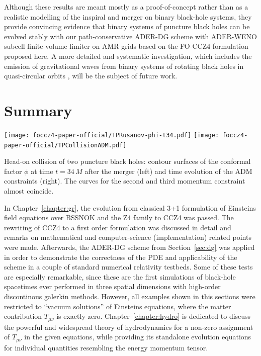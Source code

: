 Although these results are meant mostly as a proof-of-concept rather than
as a realistic modelling of the inspiral and merger on binary black-hole
systems, they provide convincing evidence that binary systems of puncture
black holes can be evolved stably with our path-conservative ADER-DG
scheme with ADER-WENO subcell finite-volume limiter on AMR grids based on
the FO-CCZ4 formulation proposed here. A more detailed and systematic
investigation, which includes the emission of gravitational waves from
binary systems of rotating black holes in quasi-circular orbits 
\cite{Alic:2011a}, will be the subject of future work.

\section{Summary}
\begin{marginfigure}
	\texttt{[image: foccz4-paper-official/TPRusanov-phi-t34.pdf]}
	\texttt{[image: foccz4-paper-official/TPCollisionADM.pdf]}
	\caption[
	BH Head-on collision, final snapshot and error time evolution, 
	]{Head-on collision of two puncture black holes: contour
		surfaces of the conformal factor $\phi$ at time $t=34\,M$ after the
		merger (left) and time evolution of the ADM constraints (right).
		The curves for the second and third momentum constraint almost
		coincide. }
	\label{fig.twopunctures.adm}
\end{marginfigure}

In Chapter~\ref{chapter:gr}, the evolution from classical 3+1 formulation of
Einsteins field equations over BSSNOK and the Z4 family to CCZ4 was passed. The
rewriting of CCZ4 to a first order formulation was discussed in detail and
remarks on mathematical and computer-science (implementation) related points
were made. Afterwards, the ADER-DG scheme from Section~\ref{sec:dg} was applied
in order to demonstrate the correctness of the PDE and applicability of the
scheme in a couple of standard numerical relativity testbeds. Some of these
tests are especially remarkable, since these are the first simulations of 
black-hole spacetimes ever performed in three spatial dimensions with high-order
discontinous galerkin methods. However, all examples shown in this sections
were restricted to ``vacuum solutions'' of Einsteins equations, where the
matter contribution $T_{\mu\nu}$ is exactly zero. Chapter~\vref{chapter:hydro}
is dedicated to discuss the powerful and widespread theory of hydrodynamics 
for a non-zero assignment of $T_{\mu\nu}$ in the given equations, while 
providing its standalone evolution equations for individual quantities
resembling the energy momentum tensor.


